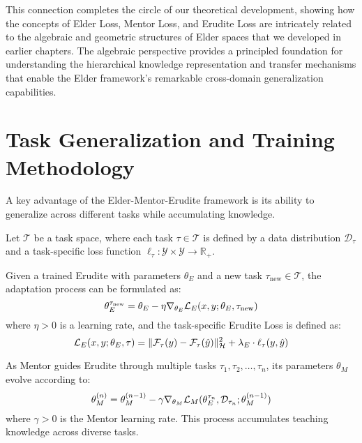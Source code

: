 This connection completes the circle of our theoretical development, showing how the concepts of Elder Loss, Mentor Loss, and Erudite Loss are intricately related to the algebraic and geometric structures of Elder spaces that we developed in earlier chapters. The algebraic perspective provides a principled foundation for understanding the hierarchical knowledge representation and transfer mechanisms that enable the Elder framework's remarkable cross-domain generalization capabilities.

\section{Task Generalization and Training Methodology}

A key advantage of the Elder-Mentor-Erudite framework is its ability to generalize across different tasks while accumulating knowledge.

\begin{definition}
Let $\mathcal{T}$ be a task space, where each task $\tau \in \mathcal{T}$ is defined by a data distribution $\mathcal{D}_\tau$ and a task-specific loss function $\ell_\tau: \mathcal{Y} \times \mathcal{Y} \rightarrow \mathbb{R}_+$.
\end{definition}

\begin{theorem}
Given a trained Erudite with parameters $\theta_E$ and a new task $\tau_{\text{new}} \in \mathcal{T}$, the adaptation process can be formulated as:
\begin{equation}
\theta_E^{\tau_{\text{new}}} = \theta_E - \eta \nabla_{\theta_E} \mathcal{L}_E(x, y; \theta_E, \tau_{\text{new}})
\end{equation}
where $\eta > 0$ is a learning rate, and the task-specific Erudite Loss is defined as:
\begin{equation}
\mathcal{L}_E(x, y; \theta_E, \tau) = \| \mathcal{F}_\tau(y) - \mathcal{F}_\tau(\hat{y}) \|_{\mathcal{H}}^2 + \lambda_E \cdot \ell_\tau(y, \hat{y})
\end{equation}
\end{theorem}

\begin{proposition}
As Mentor guides Erudite through multiple tasks $\tau_1, \tau_2, \ldots, \tau_n$, its parameters $\theta_M$ evolve according to:
\begin{equation}
\theta_M^{(n)} = \theta_M^{(n-1)} - \gamma \nabla_{\theta_M} \mathcal{L}_M(\theta_E^{\tau_n}, \mathcal{D}_{\tau_n}; \theta_M^{(n-1)})
\end{equation}
where $\gamma > 0$ is the Mentor learning rate. This process accumulates teaching knowledge across diverse tasks.
\end{proposition}

